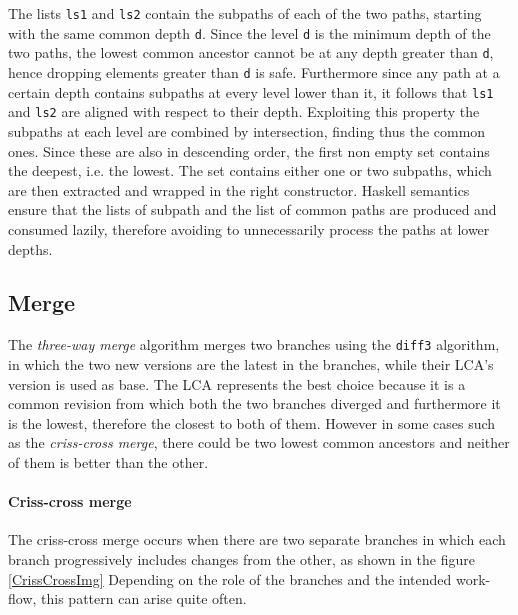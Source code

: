 \documentclass[../Thesis.tex]{subfiles}
\begin{document}
	The lists \texttt{ls1} and \texttt{ls2} contain the subpaths of each
	of the two paths, starting with the same common depth \texttt{d}.
	Since the level \texttt{d} is the minimum depth of the two paths, the
	lowest common ancestor cannot be at any depth greater than \texttt{d},
	hence dropping elements greater than \texttt{d} is safe. Furthermore
	since any path at a certain depth contains subpaths at every level
	lower than it, it follows that \texttt{ls1} and \texttt{ls2} are aligned
	with respect to their depth.
	Exploiting this property the subpaths at each level are combined by
	intersection, finding thus the common ones.
	Since these are also in descending order, 
	the first non empty set contains the deepest, i.e. the lowest.
	The set contains either one or two subpaths, which are then extracted
	and wrapped in the right constructor.
	Haskell semantics ensure that the lists of subpath and the list
	of common paths are produced and consumed lazily, therefore
	avoiding to unnecessarily process the paths at lower depths.
	
	\subsection{Merge}
	\label{subsec:MergeLCA}
	The \emph{three-way merge} algorithm merges two branches using the 
	\texttt{diff3} algorithm, in which the two new versions are the 
	latest in the branches, while their LCA's version is used as 
	base. The LCA represents the best choice because
	it is a common revision from which both the two branches diverged and
	furthermore it is the lowest, therefore the closest to both of them.
	However in some cases such as the \emph{criss-cross merge}, 
	there could be two lowest common ancestors and neither of them
	is better than the other.
	
	\paragraph{Criss-cross merge}
	The criss-cross merge occurs when there are two separate branches
	in which each branch progressively includes changes from the other,
	as shown in the figure \ref{CrissCrossImg}
	Depending on the role of the branches and the intended work-flow,
	this pattern can arise quite often.
	
\end{document}
